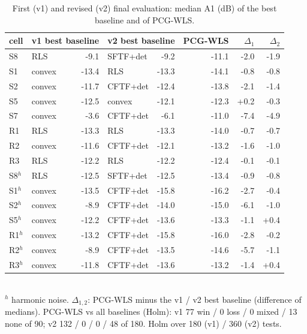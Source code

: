 \begin{table}[t]\centering\caption{First (v1) and revised (v2) final evaluation: median A1 (dB) of the best baseline and of PCG-WLS.}\label{tab:v1v2}
\scriptsize
\begin{tabular}{llrlrrrr}
\toprule
cell & \multicolumn{2}{c}{v1 best baseline} & \multicolumn{2}{c}{v2 best baseline} & PCG-WLS & $\Delta_1$ & $\Delta_2$ \\
\midrule
S8 & RLS & -9.1 & SFTF+det & -9.2 & -11.1 & -2.0 & -1.9 \\
S1 & convex & -13.4 & RLS & -13.3 & -14.1 & -0.8 & -0.8 \\
S2 & convex & -11.7 & CFTF+det & -12.4 & -13.8 & -2.1 & -1.4 \\
S5 & convex & -12.5 & convex & -12.1 & -12.3 & +0.2 & -0.3 \\
S7 & convex & -3.6 & CFTF+det & -6.1 & -11.0 & -7.4 & -4.9 \\
R1 & RLS & -13.3 & RLS & -13.3 & -14.0 & -0.7 & -0.7 \\
R2 & convex & -11.6 & CFTF+det & -12.1 & -13.2 & -1.6 & -1.0 \\
R3 & RLS & -12.2 & RLS & -12.2 & -12.4 & -0.1 & -0.1 \\
S8$^h$ & RLS & -12.5 & SFTF+det & -12.5 & -13.4 & -0.9 & -0.8 \\
S1$^h$ & convex & -13.5 & CFTF+det & -15.8 & -16.2 & -2.7 & -0.4 \\
S2$^h$ & convex & -8.9 & CFTF+det & -14.0 & -15.0 & -6.1 & -1.0 \\
S5$^h$ & convex & -12.2 & CFTF+det & -13.6 & -13.3 & -1.1 & +0.4 \\
R1$^h$ & convex & -13.2 & CFTF+det & -15.8 & -16.0 & -2.8 & -0.2 \\
R2$^h$ & convex & -8.9 & CFTF+det & -13.5 & -14.6 & -5.7 & -1.1 \\
R3$^h$ & convex & -11.8 & CFTF+det & -13.6 & -13.2 & -1.4 & +0.4 \\
\bottomrule
\end{tabular}
\\[2pt]{\scriptsize $^h$ harmonic noise. $\Delta_{1,2}$: PCG-WLS minus the v1 / v2 best baseline (difference of medians). PCG-WLS vs all baselines (Holm): v1 77 win / 0 loss / 0 mixed / 13 none of 90; v2 132 / 0 / 0 / 48 of 180. Holm over 180 (v1) / 360 (v2) tests.}
\end{table}
